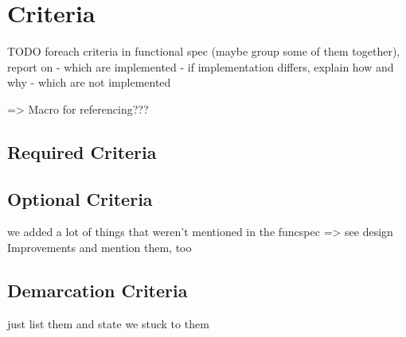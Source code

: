 \section{Criteria}

TODO foreach criteria in functional spec (maybe group some of them together), report on
	- which are implemented
		- if implementation differs, explain how and why
	- which are not implemented

=> Macro for referencing???

\subsection{Required Criteria}

\subsection{Optional Criteria}

we added a lot of things that weren't mentioned in the funcspec => see design Improvements and mention them, too

\subsection{Demarcation Criteria}

just list them and state we stuck to them
